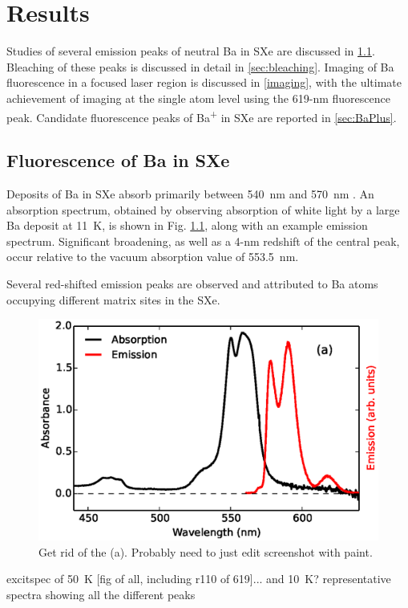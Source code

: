 \chapter{Results}

Studies of several emission peaks of neutral Ba in SXe are discussed in \ref{sec:fluorescence}.  Bleaching of these peaks is discussed in detail in \ref{sec:bleaching}.  Imaging of Ba fluorescence in a focused laser region is discussed in \ref{imaging}, with the ultimate achievement of imaging at the single atom level using the 619-nm fluorescence peak.  Candidate fluorescence peaks of Ba\textsuperscript{+} in SXe are reported in \ref{sec:BaPlus}.

\section{Fluorescence of Ba in SXe}
\label{sec:fluorescence}

Deposits of Ba in SXe absorb primarily between 540~nm and 570~nm \cite{Mong2015,Brian,Shon}.  An absorption spectrum, obtained by observing absorption of white light by a large Ba deposit at 11~K, is shown in Fig. \ref{fig:BaAbs}, along with an example emission spectrum.  Significant broadening, as well as a 4-nm redshift  of the central peak, occur relative to the vacuum absorption value of 553.5~nm.

Several red-shifted emission peaks are observed and attributed to Ba atoms occupying different matrix sites in the SXe.

\begin{figure} %
        \centering
                \includegraphics[width=.7\textwidth]{figures/BaAbs_fromBaSpec.eps}
                \caption{\color{red}Get rid of the (a).  Probably need to just edit screenshot with paint.  \cite{Mong2015}}
\label{fig:BaAbs}
\end{figure}

excitspec of 50~K [fig of all, including r110 of 619]... and 10~K?  representative spectra showing all the different peaks

